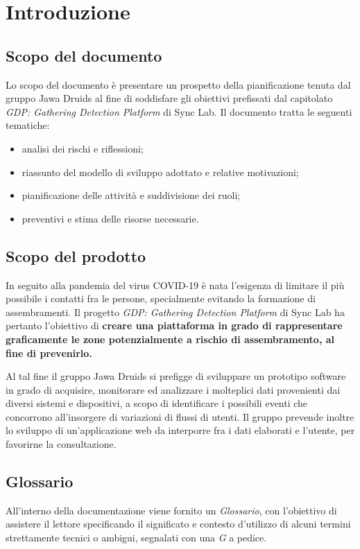 \chapter{Introduzione}

\section{Scopo del documento}
Lo scopo del documento è presentare un prospetto della pianificazione tenuta dal gruppo Jawa Druids al fine di soddisfare gli obiettivi prefissati dal capitolato \textit{GDP: Gathering Detection Platform} di Sync Lab. Il documento tratta le seguenti tematiche:
\begin{itemize}
\item analisi dei rischi e riflessioni;
\item riassunto del modello di sviluppo adottato e relative motivazioni;
\item pianificazione delle attività e suddivisione dei ruoli;
\item preventivi e stima delle risorse necessarie.
\end{itemize}

\section{Scopo del prodotto}
In seguito alla pandemia del virus COVID-19 è nata l'esigenza di limitare il più possibile i contatti fra le persone, specialmente evitando la formazione di assembramenti. Il progetto \textit{GDP: Gathering Detection Platform} di Sync Lab ha pertanto l'obiettivo di \textbf{creare una piattaforma in grado di rappresentare graficamente le zone potenzialmente a rischio di assembramento, al fine di prevenirlo.}

Al tal fine il gruppo Jawa Druids si prefigge di sviluppare un prototipo software in grado di acquisire, monitorare ed analizzare i molteplici dati provenienti dai diversi sistemi e dispositivi, a scopo di identificare i possibili eventi che concorrono all’insorgere di variazioni di flussi di utenti. Il gruppo prevende inoltre lo sviluppo di un'applicazione web da interporre fra i dati elaborati e l'utente, per favorirne la consultazione.

\section{Glossario}

All'interno della documentazione viene fornito un \textit{Glossario}, con l'obiettivo di assistere il lettore specificando il significato e contesto d'utilizzo di alcuni termini strettamente tecnici o ambigui, segnalati con una \textit{G} a pedice.
